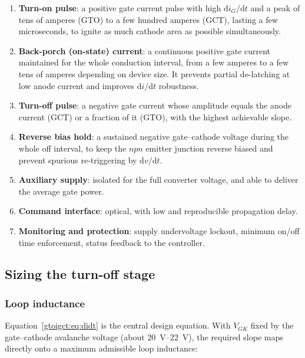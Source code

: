 \begin{enumerate}[nosep]
  \item \textbf{Turn-on pulse}: a positive gate current pulse with high
        $\mathrm{d}i_{G}/\mathrm{d}t$ and a peak of tens of amperes (GTO) to a few
        hundred amperes (GCT), lasting a few microseconds, to ignite as much
        cathode area as possible simultaneously.
  \item \textbf{Back-porch (on-state) current}: a continuous positive gate
        current maintained for the whole conduction interval, from a few amperes
        to a few tens of amperes depending on device size. It prevents partial
        de-latching at low anode current and improves $\mathrm{d}i/\mathrm{d}t$
        robustness.
  \item \textbf{Turn-off pulse}: a negative gate current whose amplitude equals
        the anode current (GCT) or a fraction of it (GTO), with the highest
        achievable slope.
  \item \textbf{Reverse bias hold}: a sustained negative gate--cathode voltage
        during the whole off interval, to keep the $npn$ emitter junction
        reverse biased and prevent spurious re-triggering by $\mathrm{d}v/\mathrm{d}t$.
  \item \textbf{Auxiliary supply}: isolated for the full converter voltage, and
        able to deliver the average gate power.
  \item \textbf{Command interface}: optical, with low and reproducible
        propagation delay.
  \item \textbf{Monitoring and protection}: supply undervoltage lockout, minimum
        on/off time enforcement, status feedback to the controller.
\end{enumerate}

\subsection{Sizing the turn-off stage}

\subsubsection{Loop inductance}

Equation~\eqref{gtoigct:eq:didt} is the central design equation. With $V_{GK}$ fixed by
the gate--cathode avalanche voltage (about \SIrange{20}{22}{\volt}), the required
slope maps directly onto a maximum admissible loop inductance:

